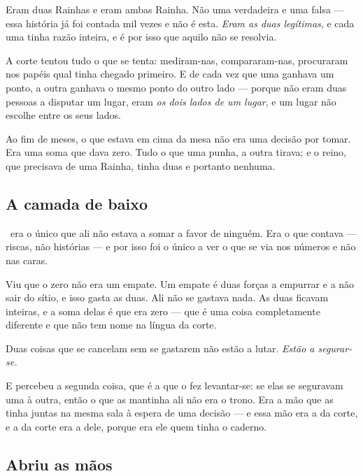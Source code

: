 \documentclass[livro.tex]{subfiles}
\begin{document}
Eram duas Rainhas e eram ambas Rainha. Não uma verdadeira e uma falsa --- essa história já foi
contada mil vezes e não é esta. \emph{Eram as duas legítimas}, e cada uma tinha razão inteira, e é
por isso que aquilo não se resolvia.

\medskip

A corte tentou tudo o que se tenta: mediram-nas, compararam-nas, procuraram nos papéis qual tinha
chegado primeiro. E de cada vez que uma ganhava um ponto, a outra ganhava o mesmo ponto do outro
lado --- porque não eram duas pessoas a disputar um lugar, eram \emph{os dois lados de um lugar},
e um lugar não escolhe entre os seus lados.

\medskip

Ao fim de meses, o que estava em cima da mesa não era uma decisão por tomar. Era uma soma que dava
zero. Tudo o que uma punha, a outra tirava; e o reino, que precisava de uma Rainha, tinha duas e
portanto nenhuma.

\subsection*{A camada de baixo}

\Joa\ era o único que ali não estava a somar a favor de ninguém. Era o que contava --- riscas, não
histórias --- e por isso foi o único a ver o que se via nos números e não nas caras.

\medskip

Viu que o zero não era um empate. Um empate é duas forças a empurrar e a não sair do sítio, e isso
gasta as duas. Ali não se gastava nada. As duas ficavam inteiras, e a soma delas é que era zero
--- que é uma coisa completamente diferente e que não tem nome na língua da corte.

\medskip

Duas coisas que se cancelam sem se gastarem não estão a lutar. \emph{Estão a segurar-se.}

\medskip

E percebeu a segunda coisa, que é a que o fez levantar-se: se elas se seguravam uma à outra, então
o que as mantinha ali não era o trono. Era a mão que as tinha juntas na mesma sala à espera de
uma decisão --- e essa mão era a da corte, e a da corte era a dele, porque era ele quem tinha o
caderno.

\subsection*{Abriu as mãos}
\end{document}
